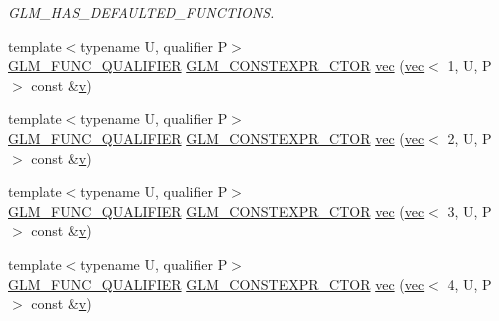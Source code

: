 \begin{DoxyCompactItemize}
\begin{DoxyCompactList}\small\item\em G\+L\+M\+\_\+\+H\+A\+S\+\_\+\+D\+E\+F\+A\+U\+L\+T\+E\+D\+\_\+\+F\+U\+N\+C\+T\+I\+O\+NS. \end{DoxyCompactList}\item 
{\footnotesize template$<$typename U, qualifier P$>$ }\\\hyperlink{setup_8hpp_a33fdea6f91c5f834105f7415e2a64407}{G\+L\+M\+\_\+\+F\+U\+N\+C\+\_\+\+Q\+U\+A\+L\+I\+F\+I\+ER} \hyperlink{setup_8hpp_ad34178a09666081abdb573c14d1f4a5a}{G\+L\+M\+\_\+\+C\+O\+N\+S\+T\+E\+X\+P\+R\+\_\+\+C\+T\+OR} \hyperlink{structglm_1_1vec_3_011_00_01_t_00_01_q_01_4_ab8d935770c08c100f574755cf3ab3206}{vec} (\hyperlink{structglm_1_1vec}{vec}$<$ 1, U, P $>$ const \&\hyperlink{_s_d_l__opengl_8h_a10a82eabcb59d2fcd74acee063775f90}{v})
\item 
{\footnotesize template$<$typename U, qualifier P$>$ }\\\hyperlink{setup_8hpp_a33fdea6f91c5f834105f7415e2a64407}{G\+L\+M\+\_\+\+F\+U\+N\+C\+\_\+\+Q\+U\+A\+L\+I\+F\+I\+ER} \hyperlink{setup_8hpp_ad34178a09666081abdb573c14d1f4a5a}{G\+L\+M\+\_\+\+C\+O\+N\+S\+T\+E\+X\+P\+R\+\_\+\+C\+T\+OR} \hyperlink{structglm_1_1vec_3_011_00_01_t_00_01_q_01_4_ab8eadeb013caada0e6a27cfa842ca8da}{vec} (\hyperlink{structglm_1_1vec}{vec}$<$ 2, U, P $>$ const \&\hyperlink{_s_d_l__opengl_8h_a10a82eabcb59d2fcd74acee063775f90}{v})
\item 
{\footnotesize template$<$typename U, qualifier P$>$ }\\\hyperlink{setup_8hpp_a33fdea6f91c5f834105f7415e2a64407}{G\+L\+M\+\_\+\+F\+U\+N\+C\+\_\+\+Q\+U\+A\+L\+I\+F\+I\+ER} \hyperlink{setup_8hpp_ad34178a09666081abdb573c14d1f4a5a}{G\+L\+M\+\_\+\+C\+O\+N\+S\+T\+E\+X\+P\+R\+\_\+\+C\+T\+OR} \hyperlink{structglm_1_1vec_3_011_00_01_t_00_01_q_01_4_adb99870d209d6225f67a5d12e8f04df5}{vec} (\hyperlink{structglm_1_1vec}{vec}$<$ 3, U, P $>$ const \&\hyperlink{_s_d_l__opengl_8h_a10a82eabcb59d2fcd74acee063775f90}{v})
\item 
{\footnotesize template$<$typename U, qualifier P$>$ }\\\hyperlink{setup_8hpp_a33fdea6f91c5f834105f7415e2a64407}{G\+L\+M\+\_\+\+F\+U\+N\+C\+\_\+\+Q\+U\+A\+L\+I\+F\+I\+ER} \hyperlink{setup_8hpp_ad34178a09666081abdb573c14d1f4a5a}{G\+L\+M\+\_\+\+C\+O\+N\+S\+T\+E\+X\+P\+R\+\_\+\+C\+T\+OR} \hyperlink{structglm_1_1vec_3_011_00_01_t_00_01_q_01_4_a488f936163dd6df03df27373e8337869}{vec} (\hyperlink{structglm_1_1vec}{vec}$<$ 4, U, P $>$ const \&\hyperlink{_s_d_l__opengl_8h_a10a82eabcb59d2fcd74acee063775f90}{v})

\end{DoxyCompactItemize}
